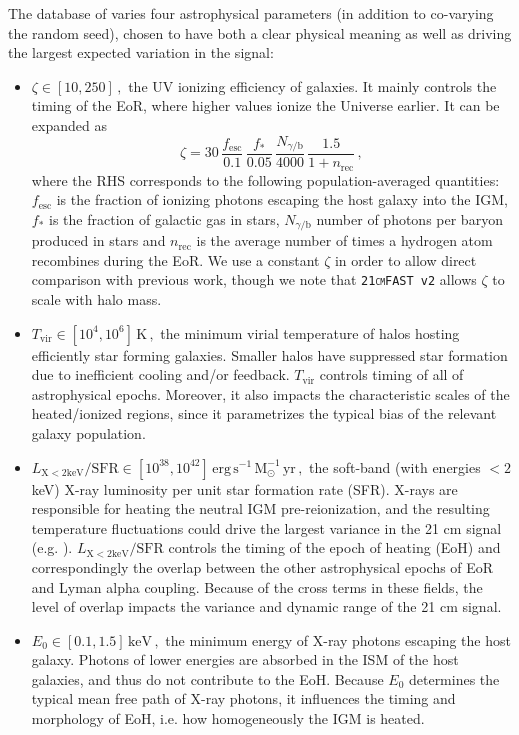 \documentclass[fleqn,usenatbib]{mnras}
\newcommand{\cmfast}{\textsc{{\tt 21cmFAST}}}
\begin{document}
The database of \cite{gillet19} varies four astrophysical parameters (in addition to co-varying the random seed), chosen to have both a clear physical meaning as well as driving the largest expected variation in the signal:
\begin{itemize}
    \item $\zeta \in [10, 250] \, ,$ the UV ionizing efficiency of galaxies. It mainly controls the timing of the EoR, where higher values ionize the Universe earlier. It can be expanded as
    \begin{equation}
        \zeta = 30 \, \frac{f_{\mathrm{esc}}}{0.1} \, \frac{f_*}{0.05} \, \frac{N_{\gamma/\mathrm{b}}}{4000} \, \frac{1.5}{1 + n_{\mathrm{rec}}} \, ,
    \end{equation}
    where the RHS corresponds to the following population-averaged quantities: $f_{\mathrm{esc}}$ is the fraction of ionizing photons escaping the host galaxy into the IGM, $f_*$ is the fraction of galactic gas in stars, $N_{\gamma/\mathrm{b}}$ number of photons per baryon produced in stars and $n_{\mathrm{rec}}$ is the average number of times a hydrogen atom recombines during the EoR.  We use a constant $\zeta$ in order to allow direct comparison with previous work, though we note that \texttt{\cmfast{} v2} allows $\zeta$ to scale with halo mass.

    \item $T_{\mathrm{vir}} \in [10^4, 10^6]\, \mathrm{K} \, ,$ the minimum virial temperature of halos hosting efficiently star forming galaxies.  Smaller halos have suppressed star formation due to inefficient cooling and/or feedback.  $T_\mathrm{vir}$ controls timing of all of astrophysical epochs.  Moreover, it also impacts the characteristic scales of the heated/ionized regions, since it parametrizes the typical bias of the relevant galaxy population.
  
    \item $L_{\mathrm{X<2keV}}/\mathrm{SFR} \in [10^{38}, 10^{42}]\, \mathrm{erg \, s^{-1} \, M_{\odot}^{-1} \, yr\, ,}$ the soft-band (with energies $<2$keV) X-ray luminosity per unit star formation rate (SFR). X-rays are responsible for heating the neutral IGM pre-reionization, and the resulting temperature fluctuations could drive the largest variance in the 21 cm signal (e.g. \citealt{Mesinger14}). $L_{\mathrm{X<2keV}}/\mathrm{SFR}$ controls the timing of the epoch of heating (EoH) and correspondingly the overlap between the other astrophysical epochs of EoR and Lyman alpha coupling.  Because of the cross terms in these fields, the level of overlap impacts the variance and dynamic range of the 21 cm signal.
    
    \item $E_0 \in [0.1, 1.5] \, \mathrm{keV} \, ,$ the minimum energy of X-ray photons escaping the host galaxy. Photons of lower energies are absorbed in the ISM of the host galaxies, and thus do not contribute to the EoH.  Because $E_0$ determines the typical mean free path of X-ray photons, it influences the timing and morphology of EoH, i.e. how homogeneously the IGM is heated. 
\end{itemize}
\end{document}
